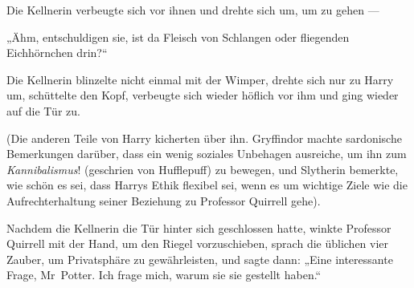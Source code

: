 Die Kellnerin verbeugte sich vor ihnen und drehte sich um, um zu gehen —

„Ähm, entschuldigen sie, ist da Fleisch von Schlangen oder fliegenden Eichhörnchen drin?“

Die Kellnerin blinzelte nicht einmal mit der Wimper, drehte sich nur zu Harry um, schüttelte den Kopf, verbeugte sich wieder höflich vor ihm und ging wieder auf die Tür zu.

(Die anderen Teile von Harry kicherten über ihn. Gryffindor machte sardonische Bemerkungen darüber, dass ein wenig soziales Unbehagen ausreiche, um ihn zum \emph{Kannibalismus}! (geschrien von Hufflepuff) zu bewegen, und Slytherin bemerkte, wie schön es sei, dass Harrys Ethik flexibel sei, wenn es um wichtige Ziele wie die Aufrechterhaltung seiner Beziehung zu Professor Quirrell gehe).

Nachdem die Kellnerin die Tür hinter sich geschlossen hatte, winkte Professor Quirrell mit der Hand, um den Riegel vorzuschieben, sprach die üblichen vier Zauber, um Privatsphäre zu gewährleisten, und sagte dann:
„Eine interessante Frage, Mr~Potter. Ich frage mich, warum sie sie gestellt haben.“

